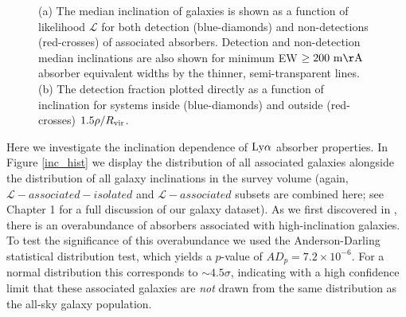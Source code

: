 \documentclass[twocolumn,tighten]{aastex62}
\begin{document}
\begin{figure}[ht!]
        \centering
        \vspace{0pt}
        \caption{\small{(a) The median inclination of galaxies is shown as a function of likelihood $\mathcal{L}$ for both detection (blue-diamonds) and non-detections (red-crosses) of associated absorbers. Detection and non-detection median inclinations are also shown for minimum EW $\rm \ge 200~ m\AA$ absorber equivalent widths by the thinner, semi-transparent lines. (b) The detection fraction plotted directly as a function of inclination for systems inside (blue-diamonds) and outside (red-crosses) $1.5 \rho / R_{\rm vir}$.}}
        \vspace{0pt}
        \label{detection_fraction_inc_both}
\end{figure}

Here we investigate the inclination dependence of $\rm Ly\alpha$ absorber properties. In Figure \ref{inc_hist} we display the distribution of all associated galaxies alongside the distribution of all galaxy inclinations in the survey volume (again, $\mathcal{L}-associated-isolated$ and $\mathcal{L}-associated$ subsets are combined here; see Chapter 1 for a full discussion of our galaxy dataset). As we first discovered in \cite{french2017}, there is an overabundance of absorbers associated with high-inclination galaxies. To test the significance of this overabundance we used the Anderson-Darling statistical distribution test, which yields a $p$-value of $AD_p = 7.2 \times 10^{-6}$. For a normal distribution this corresponds to $\sim 4.5 \sigma$, indicating with a high confidence limit that these associated galaxies are \emph{not} drawn from the same distribution as the all-sky galaxy population.
\end{document}
